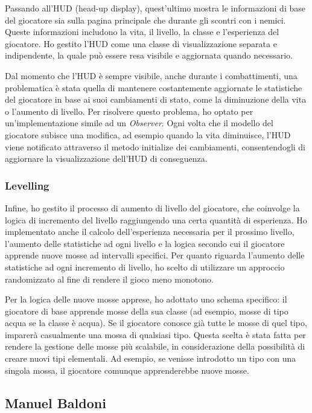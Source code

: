 \documentclass[a4paper,12pt]{report}
\begin{document}
Passando all'HUD (head-up display), quest'ultimo mostra le informazioni di base del giocatore sia sulla pagina principale che durante gli scontri con i nemici. Queste informazioni includono la vita, il livello, la classe e l'esperienza del giocatore. Ho gestito l'HUD come una classe di visualizzazione separata e indipendente, la quale può essere resa visibile e aggiornata quando necessario.

Dal momento che l'HUD è sempre visibile, anche durante i combattimenti, una problematica è stata quella di mantenere costantemente aggiornate le statistiche del giocatore in base ai suoi cambiamenti di stato, come la diminuzione della vita o l'aumento di livello. Per risolvere questo problema, ho optato per un'implementazione simile ad un \textit{Observer}. Ogni volta che il modello del giocatore subisce una modifica, ad esempio quando la vita diminuisce, l'HUD viene notificato attraverso il metodo initialize dei cambiamenti, consentendogli di aggiornare la visualizzazione dell'HUD di conseguenza.
\subsubsection{Levelling}
Infine, ho gestito il processo di aumento di livello del giocatore, che coinvolge la logica di incremento del livello raggiungendo una certa quantità di esperienza. Ho implementato anche il calcolo dell'esperienza necessaria per il prossimo livello, l'aumento delle statistiche ad ogni livello e la logica secondo cui il giocatore apprende nuove mosse ad intervalli specifici.
Per quanto riguarda l'aumento delle statistiche ad ogni incremento di livello, ho scelto di utilizzare un approccio randomizzato al fine di rendere il gioco meno monotono.

Per la logica delle nuove mosse apprese, ho adottato uno schema specifico: il giocatore di base apprende mosse della sua classe (ad esempio, mosse di tipo acqua se la classe è acqua). Se il giocatore conosce già tutte le mosse di quel tipo, imparerà casualmente una mossa di qualsiasi tipo. Questa scelta è stata fatta per rendere la gestione delle mosse più scalabile, in considerazione della possibilità di creare nuovi tipi elementali. Ad esempio, se venisse introdotto un tipo con una singola mossa, il giocatore comunque apprenderebbe nuove mosse.

\subsection*{Manuel Baldoni}
\end{document}
